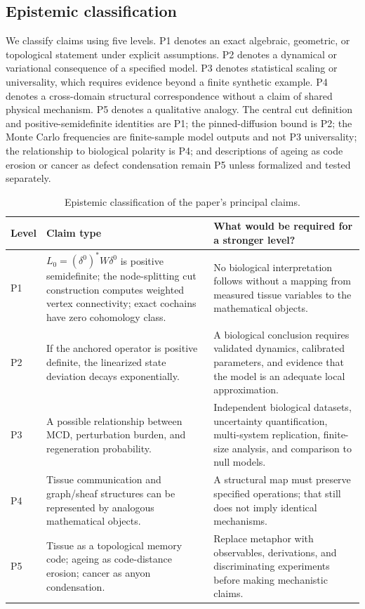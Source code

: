 \documentclass[12pt,a4paper]{article}
\begin{document}
\subsection{Epistemic classification}
We classify claims using five levels. P1 denotes an exact algebraic, geometric, or topological statement under explicit assumptions. P2 denotes a dynamical or variational consequence of a specified model. P3 denotes statistical scaling or universality, which requires evidence beyond a finite synthetic example. P4 denotes a cross-domain structural correspondence without a claim of shared physical mechanism. P5 denotes a qualitative analogy. The central cut definition and positive-semidefinite identities are P1; the pinned-diffusion bound is P2; the Monte Carlo frequencies are finite-sample model outputs and not P3 universality; the relationship to biological polarity is P4; and descriptions of ageing as code erosion or cancer as defect condensation remain P5 unless formalized and tested separately.

\begin{table}[H]
\centering\small
\caption{Epistemic classification of the paper's principal claims.}
\begin{tabularx}{\textwidth}{p{}p{}X}
\toprule
Level & Claim type & What would be required for a stronger level?\\
\midrule
P1 & \(L_0=(\delta^0)^*W\delta^0\) is positive semidefinite; the node-splitting cut construction computes weighted vertex connectivity; exact cochains have zero cohomology class. & No biological interpretation follows without a mapping from measured tissue variables to the mathematical objects.\\
P2 & If the anchored operator is positive definite, the linearized state deviation decays exponentially. & A biological conclusion requires validated dynamics, calibrated parameters, and evidence that the model is an adequate local approximation.\\
P3 & A possible relationship between MCD, perturbation burden, and regeneration probability. & Independent biological datasets, uncertainty quantification, multi-system replication, finite-size analysis, and comparison to null models.\\
P4 & Tissue communication and graph/sheaf structures can be represented by analogous mathematical objects. & A structural map must preserve specified operations; that still does not imply identical mechanisms.\\
P5 & Tissue as a topological memory code; ageing as code-distance erosion; cancer as anyon condensation. & Replace metaphor with observables, derivations, and discriminating experiments before making mechanistic claims.\\
\bottomrule
\end{tabularx}
\end{table}
\end{document}
